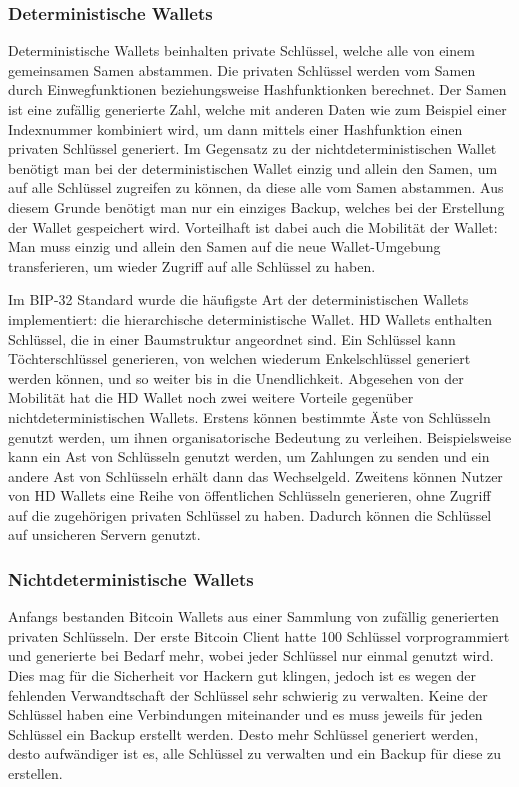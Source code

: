 \subsubsection{Deterministische Wallets}
Deterministische Wallets beinhalten private Schlüssel, welche alle von einem gemeinsamen Samen abstammen. Die privaten Schlüssel
werden vom Samen durch Einwegfunktionen beziehungsweise Hashfunktionken berechnet. Der Samen ist eine zufällig generierte Zahl,
welche mit anderen Daten wie zum Beispiel einer Indexnummer kombiniert wird, um dann mittels einer Hashfunktion einen privaten
Schlüssel generiert. Im Gegensatz zu der nichtdeterministischen Wallet benötigt man bei der deterministischen Wallet einzig und 
allein den Samen, um auf alle Schlüssel zugreifen zu können, da diese alle vom Samen abstammen. Aus diesem Grunde benötigt man
nur ein einziges Backup, welches bei der Erstellung der Wallet gespeichert wird. Vorteilhaft ist dabei auch die Mobilität der
Wallet: Man muss einzig und allein den Samen auf die neue Wallet-Umgebung transferieren, um wieder Zugriff auf alle Schlüssel
zu haben. 

Im BIP-32 Standard wurde die häufigste Art der deterministischen Wallets implementiert: die hierarchische deterministische Wallet.
HD Wallets enthalten Schlüssel, die in einer Baumstruktur angeordnet sind. Ein Schlüssel kann Töchterschlüssel generieren, von 
welchen wiederum Enkelschlüssel generiert werden können, und so weiter bis in die Unendlichkeit. Abgesehen von der Mobilität
hat die HD Wallet noch zwei weitere Vorteile gegenüber nichtdeterministischen Wallets. Erstens können bestimmte Äste von
Schlüsseln genutzt werden, um ihnen organisatorische Bedeutung zu verleihen. Beispielsweise kann ein Ast von Schlüsseln genutzt
werden, um Zahlungen zu senden und ein andere Ast von Schlüsseln erhält dann das Wechselgeld. Zweitens können Nutzer von HD
Wallets eine Reihe von öffentlichen Schlüsseln generieren, ohne Zugriff auf die zugehörigen privaten Schlüssel zu haben. Dadurch 
können die Schlüssel auf unsicheren Servern genutzt. 


\subsubsection{Nichtdeterministische Wallets}
Anfangs bestanden Bitcoin Wallets aus einer Sammlung von zufällig generierten privaten Schlüsseln. Der erste Bitcoin Client
hatte 100 Schlüssel vorprogrammiert und generierte bei Bedarf mehr, wobei jeder Schlüssel nur einmal genutzt wird. Dies mag
für die Sicherheit vor Hackern gut klingen, jedoch ist es wegen der fehlenden Verwandtschaft der Schlüssel sehr schwierig
zu verwalten. Keine der Schlüssel haben eine Verbindungen miteinander und es muss jeweils für jeden Schlüssel ein Backup
erstellt werden. Desto mehr Schlüssel generiert werden, desto aufwändiger ist es, alle Schlüssel zu verwalten und ein Backup
für diese zu erstellen.


